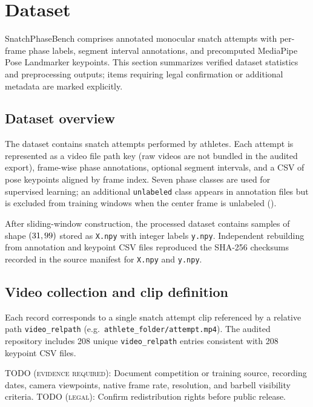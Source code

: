 \section{Dataset}
\label{sec:dataset}

SnatchPhaseBench comprises annotated monocular snatch attempts with per-frame phase labels, segment interval annotations, and precomputed MediaPipe Pose Landmarker keypoints.
This section summarizes verified dataset statistics and preprocessing outputs; items requiring legal confirmation or additional metadata are marked explicitly.

\subsection{Dataset overview}
\label{sec:dataset:overview}

The dataset contains \numvideos{} snatch attempts performed by \numathletes{} athletes.
Each attempt is represented as a video file path key (raw videos are not bundled in the audited export), frame-wise phase annotations, optional segment intervals, and a CSV of pose keypoints aligned by frame index.
Seven phase classes are used for supervised learning; an additional \texttt{unlabeled} class appears in annotation files but is excluded from training windows when the center frame is unlabeled ().

After sliding-window construction, the processed dataset contains \numwindows{} samples of shape $(31, 99)$ stored as \texttt{X.npy} with integer labels \texttt{y.npy}.
Independent rebuilding from annotation and keypoint CSV files reproduced the SHA-256 checksums recorded in the source manifest for \texttt{X.npy} and \texttt{y.npy}.

\subsection{Video collection and clip definition}
\label{sec:dataset:videos}

Each record corresponds to a single snatch attempt clip referenced by a relative path \texttt{video\_relpath} (e.g.\ \texttt{athlete\_folder/attempt.mp4}).
The audited repository includes 208 unique \texttt{video\_relpath} entries consistent with 208 keypoint CSV files.

\textsc{TODO (evidence required):} Document competition or training source, recording dates, camera viewpoints, native frame rate, resolution, and barbell visibility criteria.
\textsc{TODO (legal):} Confirm redistribution rights before public release.

